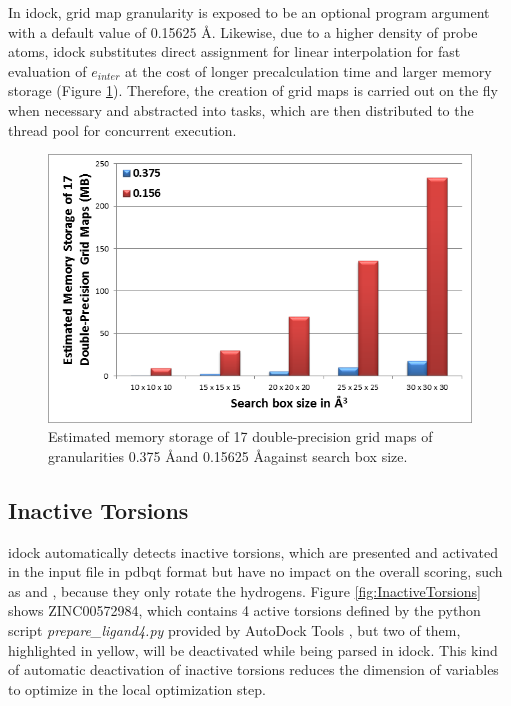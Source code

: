 In idock, grid map granularity is exposed to be an optional program argument with a default value of 0.15625 \AA. Likewise, due to a higher density of probe atoms, idock substitutes direct assignment for linear interpolation for fast evaluation of $e_{inter}$ at the cost of longer precalculation time and larger memory storage (Figure \ref{fig:GridMapStorage}). Therefore, the creation of grid maps is carried out on the fly when necessary and abstracted into tasks, which are then distributed to the thread pool for concurrent execution.

\begin{figure}
\centering
\includegraphics[width=\textwidth]{VirtualScreening/Figures/GridMapStorage.png}
\caption{Estimated memory storage of 17 double-precision grid maps of granularities 0.375 \AA and 0.15625 \AA against search box size.}
\label{fig:GridMapStorage}
\end{figure}

\subsection{Inactive Torsions}

idock automatically detects inactive torsions, which are presented and activated in the input file in pdbqt format but have no impact on the overall scoring, such as  and , because they only rotate the hydrogens. Figure \ref{fig:InactiveTorsions} shows ZINC00572984, which contains 4 active torsions defined by the python script \textit{prepare\_ligand4.py} provided by AutoDock Tools \citep{785-1999,596-2009}, but two of them, highlighted in yellow, will be deactivated while being parsed in idock. This kind of automatic deactivation of inactive torsions reduces the dimension of variables to optimize in the local optimization step.

